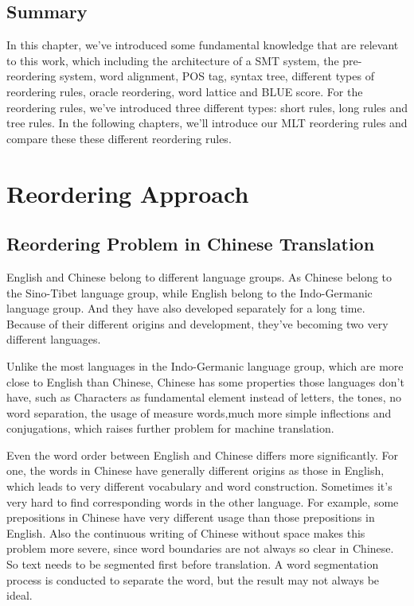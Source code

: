 \section{Summary}

In this chapter, we've introduced some fundamental knowledge that are relevant to this work, which including the architecture of a SMT system, the pre-reordering system, word alignment, POS tag, syntax tree, different types of reordering rules, oracle reordering, word lattice and BLUE score. For the reordering rules, we've introduced three different types: short rules, long rules and tree rules. In the following chapters, we'll introduce our MLT reordering rules and compare these these different reordering rules.

\chapter{Reordering Approach}
\label{ch:ReorderingApproach}

\section{Reordering Problem in Chinese Translation}
\label{ch:ReorderingApproach:sec:Problem}

English and Chinese belong to different language groups. As Chinese belong to the Sino-Tibet language group, while English belong to the Indo-Germanic language group. And they have also developed separately for a long time. Because of their different origins and development, they've becoming two very different languages.

Unlike the most languages in the Indo-Germanic language group, which are more close to English than Chinese, Chinese has some properties those languages don't have, such as Characters as fundamental element instead of letters, the tones, no word separation, the usage of measure words,much more simple inflections and conjugations, which raises further problem for machine translation.

Even the word order between English and Chinese differs more significantly. For one, the words in Chinese have generally different origins as those in English, which leads to very different vocabulary and word construction. Sometimes it's very hard to find corresponding words in the other language. For example, some prepositions in Chinese have very different usage than those prepositions in English. Also the continuous writing of Chinese without space makes this problem more severe, since word boundaries are not always so clear in Chinese. So text needs to be segmented first before translation. A word segmentation process is conducted to separate the word, but the result may not always be ideal.


